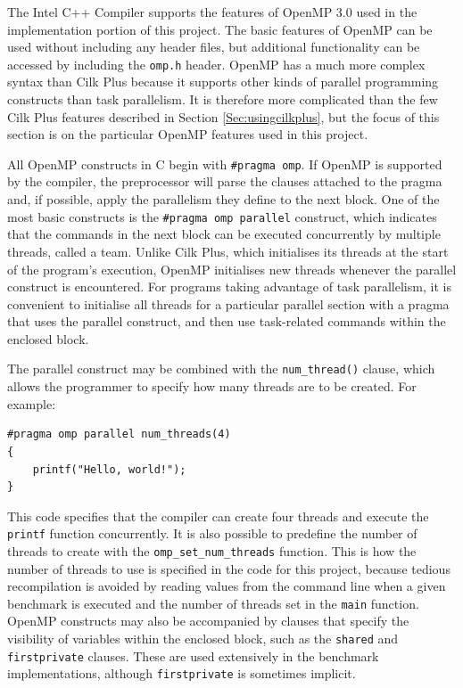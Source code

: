 \documentclass{report}
\newenvironment{mono}{\fontfamily{ttfamily}\selectfont}{\par}
\newenvironment{embedcode}{\begin{changemargin}{6em}{3em}\begin{mono}{}}{\end{mono}\end{changemargin}}
\begin{document}
The Intel C++ Compiler supports the features of OpenMP 3.0 used in the implementation portion of this project. The basic features of OpenMP can be used without including any header files, but additional functionality can be accessed by including the \verb!omp.h! header\cite{Jeffers13}. OpenMP has a much more complex syntax than Cilk Plus because it supports other kinds of parallel programming constructs than task parallelism\cite{openmpspec}. It is therefore more complicated than the few Cilk Plus features described in Section \ref{Sec:usingcilkplus}, but the focus of this section is on the particular OpenMP features used in this project. 

All OpenMP constructs in C begin with \verb!#pragma omp!. If OpenMP is supported by the compiler, the preprocessor will parse the clauses attached to the pragma and, if possible, apply the parallelism they define to the next block. One of the most basic constructs is the \verb!#pragma omp parallel! construct, which indicates that the commands in the next block can be executed concurrently by multiple threads, called a team\cite{openmpspec}. Unlike Cilk Plus, which initialises its threads at the start of the program's execution, OpenMP initialises new threads whenever the parallel construct is encountered. For programs taking advantage of task parallelism, it is convenient to initialise all threads for a particular parallel section with a pragma that uses the parallel construct, and then use task-related commands within the enclosed block.

The parallel construct may be combined with the \verb!num_thread()! clause, which allows the programmer to specify how many threads are to be created. For example:

\begin{embedcode}
\begin{verbatim}
#pragma omp parallel num_threads(4)
{
    printf("Hello, world!");
}
\end{verbatim}
\end{embedcode}

This code specifies that the compiler can create four threads and execute the \verb!printf! function concurrently. It is also possible to predefine the number of threads to create with the \verb!omp_set_num_threads! function. This is how the number of threads to use is specified in the code for this project, because tedious recompilation is avoided by reading values from the command line when a given benchmark is executed and the number of threads set in the \verb!main! function. OpenMP constructs may also be accompanied by clauses that specify the visibility of variables within the enclosed block, such as the \verb!shared! and \verb!firstprivate! clauses. These are used extensively in the benchmark implementations, although \verb!firstprivate! is sometimes implicit\cite{openmpspec}.
\end{document}
